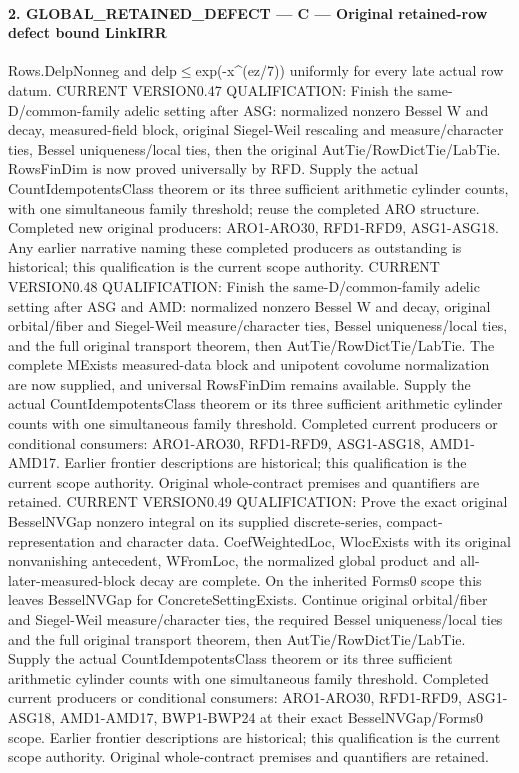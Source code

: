 \paragraph{2. GLOBAL\_\allowbreak RETAINED\_\allowbreak DEFECT — C — Original retained-row defect bound LinkIRR}

Rows.DelpNonneg and delp$\le$exp(-x\textasciicircum{}(ez/7)) uniformly for every late actual row datum. CURRENT VERSION0.47 QUALIFICATION: Finish the same-D/common-family adelic setting after ASG: normalized nonzero Bessel W and decay, measured-field block, original Siegel-Weil rescaling and measure/character ties, Bessel uniqueness/local ties, then the original AutTie/RowDictTie/LabTie. RowsFinDim is now proved universally by RFD. Supply the actual CountIdempotentsClass theorem or its three sufficient arithmetic cylinder counts, with one simultaneous family threshold; reuse the completed ARO structure. Completed new original producers: ARO1-ARO30, RFD1-RFD9, ASG1-ASG18. Any earlier narrative naming these completed producers as outstanding is historical; this qualification is the current scope authority. CURRENT VERSION0.48 QUALIFICATION: Finish the same-D/common-family adelic setting after ASG and AMD: normalized nonzero Bessel W and decay, original orbital/fiber and Siegel-Weil measure/character ties, Bessel uniqueness/local ties, and the full original transport theorem, then AutTie/RowDictTie/LabTie. The complete MExists measured-data block and unipotent covolume normalization are now supplied, and universal RowsFinDim remains available. Supply the actual CountIdempotentsClass theorem or its three sufficient arithmetic cylinder counts with one simultaneous family threshold. Completed current producers or conditional consumers: ARO1-ARO30, RFD1-RFD9, ASG1-ASG18, AMD1-AMD17. Earlier frontier descriptions are historical; this qualification is the current scope authority. Original whole-contract premises and quantifiers are retained. CURRENT VERSION0.49 QUALIFICATION: Prove the exact original BesselNVGap nonzero integral on its supplied discrete-series, compact-representation and character data. CoefWeightedLoc, WlocExists with its original nonvanishing antecedent, WFromLoc, the normalized global product and all-later-measured-block decay are complete. On the inherited Forms0 scope this leaves BesselNVGap for ConcreteSettingExists. Continue original orbital/fiber and Siegel-Weil measure/character ties, the required Bessel uniqueness/local ties and the full original transport theorem, then AutTie/RowDictTie/LabTie. Supply the actual CountIdempotentsClass theorem or its three sufficient arithmetic cylinder counts with one simultaneous family threshold. Completed current producers or conditional consumers: ARO1-ARO30, RFD1-RFD9, ASG1-ASG18, AMD1-AMD17, BWP1-BWP24 at their exact BesselNVGap/Forms0 scope. Earlier frontier descriptions are historical; this qualification is the current scope authority. Original whole-contract premises and quantifiers are retained.

